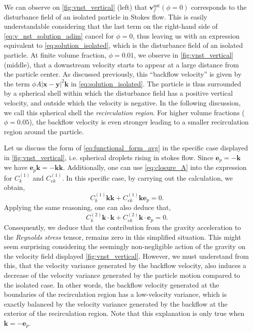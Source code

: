 We can observe on \ref{fig:vnst_vertical} (left) that $\textbf{v}^\text{nst}_f(\phi =0)$ corresponds to the disturbance field of an isolated particle in Stokes flow. 
This is easily understandable considering that the last term on the right-hand side of \ref{eq:v_nst_solution_adim} cancel for $\phi=0$, thus leaving us with an expression equivalent to \ref{eq:solution_isolated}, which is the disturbance field of an isolated particle. 
At finite volume fraction, $\phi =0.01$, we  observe in \ref{fig:vnst_vertical} (middle), that a downstream velocity starts to appear at a large distance from the particle center.  
As discussed previously, this ``backflow velocity'' is given by the term $\phi A |\textbf{x}- \textbf{y}|^2 \textbf{k}$ in \ref{eq:solution_isolated}.
The particle is thus surrounded by a spherical shell within which the disturbance field has a positive vertical velocity, and outside which the velocity is negative.
In the following discussion, we call this spherical shell the \textit{recirculation region}.   
For higher volume fractions ($\phi = 0.05$), the backflow velocity is even stronger leading to a smaller recirculation region around the particle. 

Let us discuss the form of \ref{eq:functional_form_avg} in the specific case displayed in \ref{fig:vnst_vertical}, i.e. spherical droplets rising in stokes flow. 
Since $\textbf{e}_p = - \textbf{k}$ we have $\textbf{e}_p\textbf{k} = - \textbf{kk}$. 
Additionally, one can use \ref{eq:closure_A} into the expression for $C_k^{(1)}$ and $C_{ek}^{(1)}$. 
In this specific case, by carrying out the calculation, we obtain, 
\begin{equation}
    C_k^{(1)} \textbf{kk} + C_{ek}^{(1)} \textbf{ke}_p
    = 0. 
    \label{eq:cancelation1}
\end{equation}
Applying the same reasoning, one can also deduce that, 
\begin{equation}
    C_k^{(2)} \textbf{k}\cdot \textbf{k} + C_{ek}^{(2)} \textbf{k}\cdot \textbf{e}_p
    = 0. 
    \label{eq:cancelation2}
\end{equation}
Consequently, we deduce that the contribution from the gravity acceleration to the \textit{Reynolds stress} tensor, remains zero in this simplified situation. 
This might seem surprising considering the seemingly non-negligible action of the gravity on the velocity field displayed \ref{fig:vnst_vertical}. 
However, we must understand from this, that the velocity variance generated by the backflow velocity, also induces a decrease of the velocity variance generated by the particle motion compared to the isolated case.
In other words, the backflow velocity generated at the boundaries of the recirculation region has a low-velocity variance, which is exactly balanced by the velocity variance generated by the backflow at the exterior of the recirculation region.    
Note that this explanation is only true when $\textbf{k} = - \textbf{e}_p$. 


